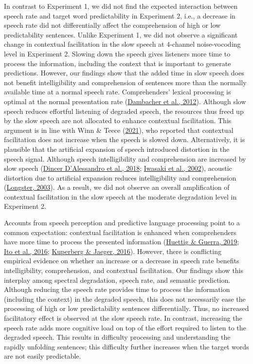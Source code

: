 \documentclass[a4paper, nobind]{templates/ociamthesis}
\begin{document}
In contrast to Experiment 1, we did not find the expected interaction between speech rate and target word predictability in Experiment 2,
i.e., a decrease in speech rate did not differentially affect the comprehension of high or low predictability sentences.
Unlike Experiment 1, we did not observe a significant change in contextual facilitation in the slow speech at 4-channel noise-vocoding level in Experiment 2.
Slowing down the speech gives listeners more time to process the information, including the context that is important to generate predictions.
However, our findings show that the added time in slow speech does not benefit intelligibility and comprehension of sentences more than the normally available time at a normal speech rate.
Comprehenders' lexical processing is optimal at the normal presentation rate (\protect\hyperlink{ref-Dambacher2012}{Dambacher et al., 2012}).
Although slow speech reduces effortful listening of degraded speech, the resources thus freed up by the slow speech are not allocated to enhance contextual facilitation.
This argument is in line with Winn \& Teece (\protect\hyperlink{ref-Winn2021}{2021}), who reported that contextual facilitation does not increase when the speech is slowed down.
Alternatively, it is plausible that the artificial expansion of speech introduced distortion in the speech signal.
Although speech intelligibility and comprehension are increased by slow speech (\protect\hyperlink{ref-Dincer2018}{Dincer D'Alessandro et al., 2018}; \protect\hyperlink{ref-Iwasaki2002}{Iwasaki et al., 2002}), acoustic distortion due to artificial expansion reduces intelligibility and comprehension (\protect\hyperlink{ref-Longster2003}{Longster, 2003}).
As a result, we did not observe an overall amplification of contextual facilitation in the slow speech at the moderate degradation level in Experiment 2.

Accounts from speech perception and predictive language processing point to a common expectation: contextual facilitation is enhanced when comprehenders have more time to process the presented information (\protect\hyperlink{ref-Huettig2019}{Huettig \& Guerra, 2019}; \protect\hyperlink{ref-Ito2016}{Ito et al., 2016}; \protect\hyperlink{ref-Kuperberg2016}{Kuperberg \& Jaeger, 2016}).
However, there is conflicting empirical evidence on whether an increase or a decrease in speech rate benefits intelligibility, comprehension, and contextual facilitation.
Our findings show this interplay among spectral degradation, speech rate, and semantic prediction.
Although reducing the speech rate provides time to process the information (including the context) in the degraded speech, this does not necessarily ease the processing of high or low predictability sentences differentially.
Thus, no increased facilitatory effect is observed at the slow speech rate.
In contrast, increasing the speech rate adds more cognitive load on top of the effort required to listen to the degraded speech.
This results in difficulty processing and understanding the rapidly unfolding sentences; this difficulty further increases when the target words are not easily predictable.
\end{document}
